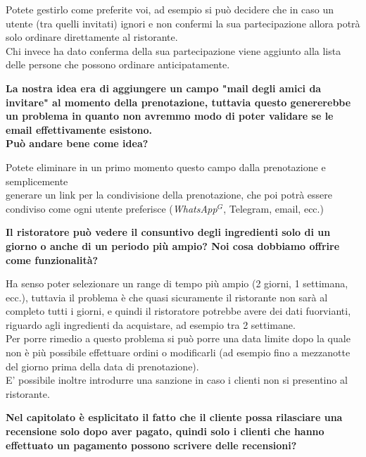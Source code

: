 \documentclass[a4paper, 11pt]{article}
\begin{document}
Potete gestirlo come preferite voi, ad esempio si può decidere che in caso un utente (tra quelli invitati) ignori e non confermi la sua partecipazione allora potrà solo ordinare direttamente al ristorante. \\
Chi invece ha dato conferma della sua partecipazione viene aggiunto alla lista delle persone che possono ordinare anticipatamente. \\ \newline


\textbf{La nostra idea era di aggiungere un campo "mail degli amici da invitare" al momento della prenotazione, tuttavia questo genererebbe un problema in quanto non avremmo modo di poter validare se le email effettivamente esistono. \\
Può andare bene come idea?}

Potete eliminare in un primo momento questo campo dalla prenotazione e semplicemente \\generare un link per la condivisione della prenotazione, che poi potrà essere condiviso come ogni utente preferisce (\emph{WhatsApp}$^{G}$, Telegram, email, ecc.) \\ \newline


\textbf{Il ristoratore può vedere il consuntivo degli ingredienti solo di un giorno o anche di un periodo più ampio? Noi cosa dobbiamo offrire come funzionalità?}

Ha senso poter selezionare un range di tempo più ampio (2 giorni, 1 settimana, ecc.), tuttavia il problema è che quasi sicuramente il ristorante non sarà al completo tutti i giorni, e quindi il ristoratore potrebbe avere dei dati fuorvianti, riguardo agli ingredienti da acquistare, ad esempio tra 2 settimane. \\
Per porre rimedio a questo problema si può porre una data limite dopo la quale non è più possibile effettuare ordini o modificarli (ad esempio fino a mezzanotte del giorno prima della data di prenotazione). \\ 
E' possibile inoltre introdurre una sanzione in caso i clienti non si presentino al ristorante. \\ \newline

\pagebreak

\textbf{Nel capitolato è esplicitato il fatto che il cliente possa rilasciare una recensione solo dopo aver pagato, quindi solo i clienti che hanno effettuato un pagamento possono scrivere delle recensioni?}
 
\end{document}
